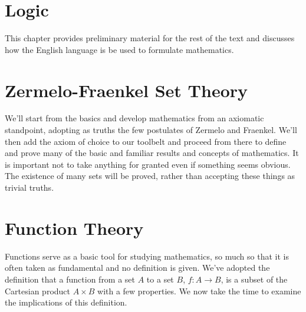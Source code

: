 \begingroup
    \ifcsname\PATH\endcsname
        \newcommand{\PATH}{books/Foundations/ZFC}
        \newcommand{\OLDPATH}{\PATH}
    \else
        \newcommand{\OLDPATH}{\PATH}
        \renewcommand{\PATH}{books/Foundations/ZFC}
    \fi
    \chapter{Logic}
        \label{chapt:Logic}%
        This chapter provides preliminary material for the rest of the text and
        discusses how the English language is be used to formulate mathematics.
        
        
    \chapter{Zermelo-Fraenkel Set Theory}
        \label{chapt:Zermelo_Fraenkel_Set_Theory}%
        We'll start from the basics and develop mathematics from an axiomatic
        standpoint, adopting as truths the few postulates of Zermelo and
        Fraenkel. We'll then add the axiom of choice to our toolbelt and
        proceed from there to define and prove many of the basic and familiar
        results and concepts of mathematics. It is important not to take
        anything for granted even if something seems obvious. The existence of
        many sets will be proved, rather than accepting these things as trivial
        truths.
        
        
        
    \chapter{Function Theory}
        \label{chapt:Function_Theory}%
        Functions serve as a basic tool for studying mathematics, so much so
        that it is often taken as fundamental and no definition is given. We've
        adopted the definition that a function from a set $A$ to
        a set $B$, $f:A\rightarrow{B}$, is a subset of the Cartesian product
        $A\times{B}$ with a few properties. We now take the time to examine the
        implications of this definition.
        
        
        
        
